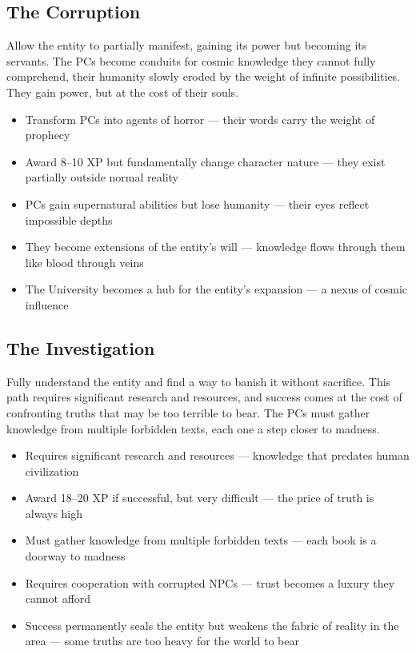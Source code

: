 \documentclass[11pt]{article}
\begin{document}
\subsection{The Corruption}

Allow the entity to partially manifest, gaining its power but becoming its servants. The PCs become conduits for cosmic knowledge they cannot fully comprehend, their humanity slowly eroded by the weight of infinite possibilities. They gain power, but at the cost of their souls.

\begin{itemize}
\item Transform PCs into agents of horror --- their words carry the weight of prophecy
\item Award 8--10 XP but fundamentally change character nature --- they exist partially outside normal reality
\item PCs gain supernatural abilities but lose humanity --- their eyes reflect impossible depths
\item They become extensions of the entity's will --- knowledge flows through them like blood through veins
\item The University becomes a hub for the entity's expansion --- a nexus of cosmic influence
\end{itemize}

\subsection{The Investigation}

Fully understand the entity and find a way to banish it without sacrifice. This path requires significant research and resources, and success comes at the cost of confronting truths that may be too terrible to bear. The PCs must gather knowledge from multiple forbidden texts, each one a step closer to madness.

\begin{itemize}
\item Requires significant research and resources --- knowledge that predates human civilization
\item Award 18--20 XP if successful, but very difficult --- the price of truth is always high
\item Must gather knowledge from multiple forbidden texts --- each book is a doorway to madness
\item Requires cooperation with corrupted NPCs --- trust becomes a luxury they cannot afford
\item Success permanently seals the entity but weakens the fabric of reality in the area --- some truths are too heavy for the world to bear
\end{itemize}
\end{document}
